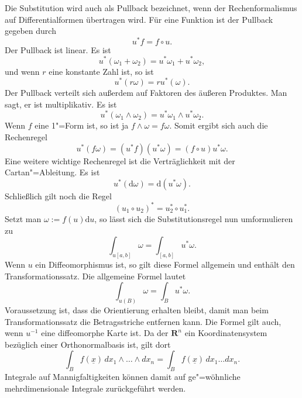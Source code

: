 \documentclass[a4paper,11pt,fleqn,twocolumn,twoside]{scrartcl}
\numberwithin{equation}{section}
\begin{document}
Die Substitution wird auch als Pullback bezeichnet, wenn der
Rechenformalismus auf Differentialformen übertragen wird. Für
eine Funktion ist der Pullback gegeben durch
\begin{equation}
u^{*}f = f\circ u.
\end{equation}
Der Pullback ist linear. Es ist
\begin{equation}
u^{*}(\omega_1+\omega_2)
= u^{*}\omega_1+u^{*}\omega_2,
\end{equation}
und wenn $r$ eine konstante Zahl ist, so ist
\begin{equation}
u^{*}(r\omega) = ru^{*}(\omega).
\end{equation}
Der Pullback verteilt sich außerdem auf Faktoren des
äußeren Produktes. Man sagt, er ist multiplikativ. Es ist
\begin{equation}
u^{*}(\omega_1\wedge\omega_2)
= u^{*}\omega_1\wedge u^{*}\omega_2.
\end{equation}
Wenn $f$ eine 1"=Form ist, so ist ja $f\wedge\omega = f\omega.$
Somit ergibt sich auch die Rechenregel
\begin{equation}
u^{*}(f\omega) = (u^{*}f)(u^{*}\omega)
= (f\circ u)u^{*}\omega.
\end{equation} 
Eine weitere wichtige Rechenregel ist die Verträglichkeit
mit der Cartan"=Ableitung. Es ist
\begin{equation}
u^{*}(\mathrm d\omega) = \mathrm d(u^{*}\omega).
\end{equation}
Schließlich gilt noch die Regel
\begin{equation}
(u_1\circ u_2)^{*} = u_2^{*}\circ u_1^{*}.
\end{equation}
Setzt man $\omega:=f(u)\mathrm du$, so lässt sich die
Substitutionsregel nun umformulieren zu
\begin{equation}
\int_{u[a,b]} \omega = \int_{[a,b]} u^{*}\omega.
\end{equation}
Wenn $u$ ein Diffeomorphismus ist, so gilt diese Formel
allgemein und enthält den Transformationssatz. Die allgemeine Formel
lautet
\begin{equation}
\int_{u(B)} \omega = \int_{B} u^{*}\omega.
\end{equation}
Voraussetzung ist, dass die Orientierung erhalten bleibt, damit man
beim Transformationssatz die Betragsstriche entfernen kann.
Die Formel gilt auch, wenn $u^{-1}$ eine diffeomorphe Karte ist.
Da der $\mathbf R^n$ ein Koordinatensystem bezüglich einer
Orthonormalbasis ist, gilt dort
\begin{equation}
\int_B f(\underline x)\, dx_1\wedge\ldots\wedge dx_n
= \int_B f(\underline x)\, dx_1\ldots dx_n.
\end{equation}
Integrale auf Mannigfaltigkeiten können damit auf ge"=wöhnliche
mehrdimensionale Integrale zurückgeführt werden.
\end{document}
